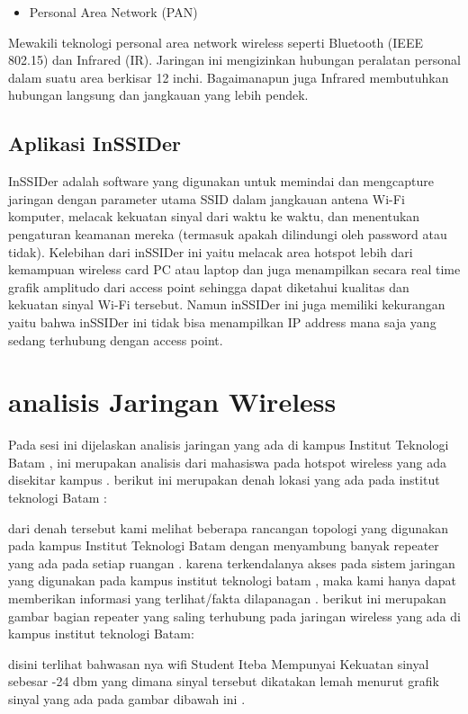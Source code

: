 \documentclass[conference]{IEEEtran}
\begin{document}
\begin{itemize}
    \item Personal Area Network (PAN)
\end{itemize}
Mewakili teknologi personal area network wireless seperti Bluetooth (IEEE 802.15) dan Infrared (IR). 
Jaringan ini mengizinkan hubungan peralatan personal dalam suatu area berkisar 12 inchi. 
Bagaimanapun juga Infrared membutuhkan hubungan langsung dan jangkauan yang lebih pendek.

\subsection{Aplikasi InSSIDer}

InSSIDer adalah software yang digunakan untuk memindai dan mengcapture jaringan dengan parameter utama SSID dalam jangkauan antena Wi-Fi komputer, melacak kekuatan sinyal dari waktu ke waktu, dan menentukan pengaturan keamanan mereka (termasuk apakah dilindungi oleh password atau tidak).
Kelebihan dari inSSIDer ini yaitu melacak area hotspot lebih dari kemampuan wireless card PC atau laptop dan juga menampilkan secara real time grafik amplitudo dari access point sehingga dapat diketahui kualitas dan kekuatan sinyal Wi-Fi tersebut. Namun inSSIDer ini juga memiliki kekurangan yaitu bahwa inSSIDer ini tidak bisa menampilkan IP address mana saja yang sedang terhubung dengan access point.


\section{analisis Jaringan Wireless}
Pada sesi ini dijelaskan analisis jaringan yang ada di kampus Institut Teknologi Batam , ini merupakan analisis dari mahasiswa
pada hotspot wireless yang ada disekitar kampus . berikut ini merupakan denah lokasi yang ada pada institut teknologi Batam :



dari denah tersebut kami melihat beberapa rancangan topologi yang digunakan pada kampus Institut Teknologi Batam dengan menyambung banyak repeater yang 
ada pada setiap ruangan . karena terkendalanya akses pada sistem jaringan yang digunakan pada kampus institut teknologi batam , maka kami hanya dapat memberikan 
informasi yang terlihat/fakta dilapanagan . berikut ini merupakan gambar bagian repeater yang saling terhubung pada jaringan wireless yang ada di kampus institut teknologi Batam:


disini terlihat bahwasan nya wifi Student Iteba Mempunyai Kekuatan sinyal sebesar -24 dbm yang dimana sinyal tersebut dikatakan lemah menurut
grafik sinyal yang ada pada gambar dibawah ini .
\end{document}
